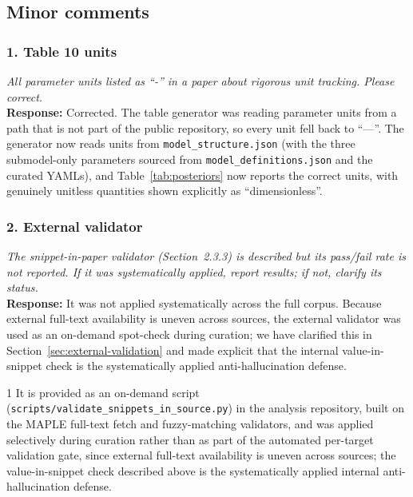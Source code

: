 \documentclass[11pt]{article}
\newcommand{\reviewer}[1]{\textcolor{reviewercolor}{\textit{#1}}}
\newcommand{\response}[1]{\textcolor{responsecolor}{\textbf{Response:} #1}}
\providecommand{\trackchanges}{1}
\newenvironment{revised}{\if1\trackchanges\color{blue}\fi}{}
\begin{document}
\bigskip

\subsection*{Minor comments}

\subsubsection*{1. Table 10 units}
\reviewer{All parameter units listed as ``-'' in a paper about rigorous unit tracking. Please correct.}\\
\response{Corrected. The table generator was reading parameter units from a path that is not part of the public repository, so every unit fell back to ``---''. The generator now reads units from \texttt{model\_structure.json} (with the three submodel-only parameters sourced from \texttt{model\_definitions.json} and the curated YAMLs), and Table~\ref{tab:posteriors} now reports the correct units, with genuinely unitless quantities shown explicitly as ``dimensionless''.}

\subsubsection*{2. External validator}
\reviewer{The snippet-in-paper validator (Section~2.3.3) is described but its pass/fail rate is not reported. If it was systematically applied, report results; if not, clarify its status.}\\
\response{It was not applied systematically across the full corpus. Because external full-text availability is uneven across sources, the external validator was used as an on-demand spot-check during curation; we have clarified this in Section~\ref{sec:external-validation} and made explicit that the internal value-in-snippet check is the systematically applied anti-hallucination defense.}

\begin{revised}
It is provided as an on-demand script (\texttt{scripts/validate\_snippets\_in\_source.py}) in the analysis repository, built on the MAPLE full-text fetch and fuzzy-matching validators, and was applied selectively during curation rather than as part of the automated per-target validation gate, since external full-text availability is uneven across sources; the value-in-snippet check described above is the systematically applied internal anti-hallucination defense.
\end{revised}
\end{document}
